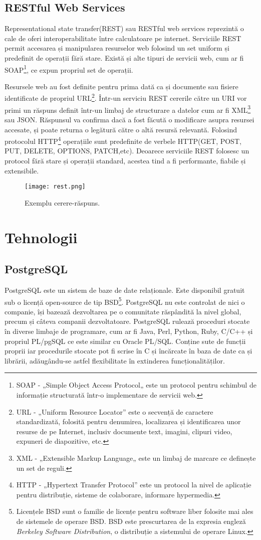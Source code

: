     \subsection{RESTful Web Services}
Representational state transfer(REST) sau RESTful web services reprezintă o cale de oferi interoperabilitate între calculatoare pe internet.
Serviciile REST permit accesarea și manipularea resurselor web folosind un set uniform și predefinit de operații fără stare. Există și 
alte tipuri de servicii web, cum ar fi SOAP\footnote{SOAP - „Simple Object Access Protocol„ este un protocol pentru schimbul de informație structurată
într-o implementare de servicii web.}, ce expun propriul set de operații.

    Resursele web au fost definite pentru prima dată ca și documente sau fisiere identificate de propriul URL\footnote{URL - 
„Uniform Resource Locator” este o secvență de caractere standardizată, folosită pentru denumirea, localizarea și identificarea unor resurse de pe Internet, inclusiv 
 documente text, imagini, clipuri video, expuneri de diapozitive, etc.}. Într-un serviciu REST
cererile către un URI vor primi un răspuns definit într-un limbaj de structurare a datelor cum ar fi XML\footnote{XML - „Extensible Markup Language„ 
este un limbaj de marcare ce definește un set de reguli.} sau JSON. Răspunsul va confirma dacă a fost făcută o modificare asupra resursei accesate,
și poate returna o legătură către o altă resursă relevantă. Folosind protocolul HTTP\footnote{HTTP - „Hypertext Transfer Protocol” este un protocol la nivel de aplicație pentru 
distribuție, sisteme de colaborare, informare hypermedia.}
operațiile sunt predefinite de verbele HTTP(GET, POST, PUT, DELETE, OPTIONS, PATCH,etc).
    Deoarece serviciile REST folosesc un protocol fără stare și operații standard, acestea tind a fi performante, fiabile și extensibile. 
\begin{figure}[h]
\texttt{[image: rest.png]}
\centering
\caption{Exemplu cerere-răspuns.}
\label{fig:rest}
\end{figure} 
\section{Tehnologii}
     \subsection{PostgreSQL}
PostgreSQL este un sistem de baze de date relaționale. Este disponibil gratuit sub o licență open-source de tip BSD\footnote{
Licențele BSD sunt o familie de licențe pentru software liber folosite mai ales de sistemele de operare BSD. BSD este prescurtarea de la expresia 
engleză \textit{Berkeley Software Distribution}, o distribuție a sistemului de operare Linux.}. PostgreSQL nu este controlat de nici o companie,
 își bazează dezvoltarea pe o comunitate răspândită la nivel global, precum și câteva companii 
dezvoltatoare. PostgreSQL rulează proceduri stocate în diverse limbaje de programare, cum ar fi Java, Perl, Python,
Ruby, C/C++ și propriul PL/pgSQL ce este similar cu Oracle PL/SQL. Conține sute de funcții proprii iar procedurile stocate 
pot fi scrise în C și încărcate în baza de date ca și librării, adăugându-se astfel flexibilitate în extinderea funcționalităților.
